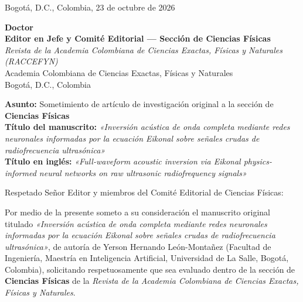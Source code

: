 \documentclass[11pt,a4paper]{article}
\begin{document}
\begin{flushright}
Bogotá, D.C., Colombia, 23 de octubre de 2026
\end{flushright}

\vspace{0.3cm}

\noindent\textbf{Doctor}\\
\textbf{Editor en Jefe y Comité Editorial — Sección de Ciencias Físicas}\\
\textit{Revista de la Academia Colombiana de Ciencias Exactas, Físicas y Naturales (RACCEFYN)}\\
Academia Colombiana de Ciencias Exactas, Físicas y Naturales\\
Bogotá, D.C., Colombia

\vspace{0.4cm}

\noindent\textbf{Asunto:} Sometimiento de artículo de investigación original a la sección de \textbf{Ciencias Físicas}\\
\textbf{Título del manuscrito:} \textit{«Inversión acústica de onda completa mediante redes neuronales informadas por la ecuación Eikonal sobre señales crudas de radiofrecuencia ultrasónica»}\\
\textbf{Título en inglés:} \textit{«Full-waveform acoustic inversion via Eikonal physics-informed neural networks on raw ultrasonic radiofrequency signals»}

\vspace{0.3cm}

\noindent Respetado Señor Editor y miembros del Comité Editorial de Ciencias Físicas:

Por medio de la presente someto a su consideración el manuscrito original titulado \textit{«Inversión acústica de onda completa mediante redes neuronales informadas por la ecuación Eikonal sobre señales crudas de radiofrecuencia ultrasónica»}, de autoría de Yerson Hernando León-Montañez (Facultad de Ingeniería, Maestría en Inteligencia Artificial, Universidad de La Salle, Bogotá, Colombia), solicitando respetuosamente que sea evaluado dentro de la sección de \textbf{Ciencias Físicas} de la \textit{Revista de la Academia Colombiana de Ciencias Exactas, Físicas y Naturales}.
\end{document}
